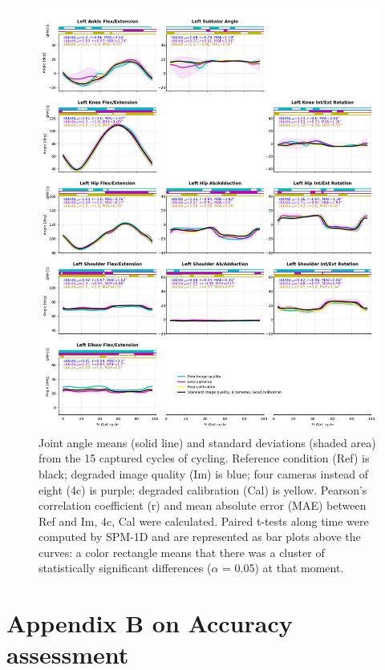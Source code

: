 \begin{figure}[!ht]
	\centering
	\def\svgwidth{1\columnwidth}
	\fontsize{10pt}{10pt}\selectfont
	\includegraphics[height=\dimexpr\textheight-145pt]{"../Annexes/Figures/Fig_BikeRobust.png"}
	\caption{Joint angle means (solid line) and standard deviations (shaded area) from the 15 captured cycles of cycling. Reference condition (Ref) is black; degraded image quality (Im) is blue; four cameras instead of eight (4c) is purple; degraded calibration (Cal) is yellow. Pearson’s correlation coefficient (r) and mean absolute error (MAE) between Ref and Im, 4c, Cal were calculated. Paired t-tests along time were computed by SPM-1D and are represented as bar plots above the curves: a color rectangle means that there was a cluster of statistically significant differences (\(\alpha\) = 0.05) at that moment.}
	\label{fig_bikerobust}
\end{figure}


\FloatBarrier
\chapter{Appendix B on Accuracy assessment}
\label{Ann:2}


